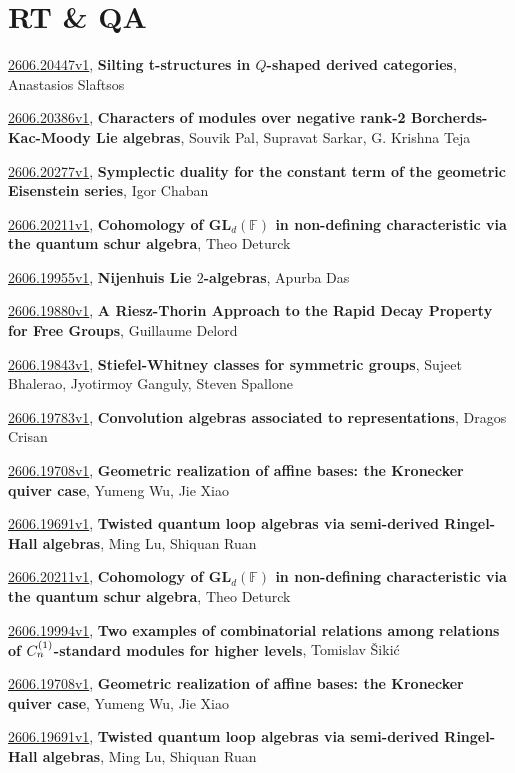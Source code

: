 \documentclass[9pt, a4paper]{article}
\theoremstyle{plain}
\theoremstyle{definition}
\theoremstyle{remark}
\newcommand{\arxiv}[3]{\href{https://arxiv.org/abs/#1}{#1}, \textbf{\textcolor{arxivblue}{#2}}, #3}
\begin{document}

\section{RT \& QA}
\arxiv{2606.20447v1}{Silting t-structures in $Q$-shaped derived categories}{Anastasios Slaftsos}

\arxiv{2606.20386v1}{Characters of modules over negative rank-2 Borcherds-Kac-Moody Lie algebras}{Souvik Pal, Supravat Sarkar, G. Krishna Teja}

\arxiv{2606.20277v1}{Symplectic duality for the constant term of the geometric Eisenstein series}{Igor Chaban}

\arxiv{2606.20211v1}{Cohomology of $\mathbf{GL}_d(\mathbb{F})$ in non-defining characteristic via the quantum schur algebra}{Theo Deturck}

\arxiv{2606.19955v1}{Nijenhuis Lie $2$-algebras}{Apurba Das}

\arxiv{2606.19880v1}{A Riesz-Thorin Approach to the Rapid Decay Property for Free Groups}{Guillaume Delord}

\arxiv{2606.19843v1}{Stiefel-Whitney classes for symmetric groups}{Sujeet Bhalerao, Jyotirmoy Ganguly, Steven Spallone}

\arxiv{2606.19783v1}{Convolution algebras associated to representations}{Dragos Crisan}

\arxiv{2606.19708v1}{Geometric realization of affine bases: the Kronecker quiver case}{Yumeng Wu, Jie Xiao}

\arxiv{2606.19691v1}{Twisted quantum loop algebras via semi-derived Ringel-Hall algebras}{Ming Lu, Shiquan Ruan}

\arxiv{2606.20211v1}{Cohomology of $\mathbf{GL}_d(\mathbb{F})$ in non-defining characteristic via the quantum schur algebra}{Theo Deturck}

\arxiv{2606.19994v1}{Two examples of combinatorial relations among relations of $C_{n}\sp{(1)}$-standard modules for higher levels}{Tomislav Šiki\' c}

\arxiv{2606.19708v1}{Geometric realization of affine bases: the Kronecker quiver case}{Yumeng Wu, Jie Xiao}

\arxiv{2606.19691v1}{Twisted quantum loop algebras via semi-derived Ringel-Hall algebras}{Ming Lu, Shiquan Ruan}

\end{document}
